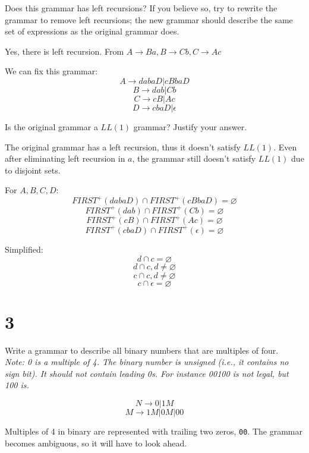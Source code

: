 \documentclass[11pt]{article}
\begin{document}
\begin{Parts}
	\Part Does this grammar has left recursions? If you believe so, try to rewrite the grammar to remove left recursions; the new grammar should describe the same set of expressions as the original grammar does.
	\begin{Answer}
		Yes, there is left recursion. From $A \rightarrow Ba, B \rightarrow Cb, C \rightarrow Ac$
		
		We can fix this grammar:
		$$A \rightarrow dabaD | cBbaD$$
		$$B \rightarrow dab | Cb$$
		$$C \rightarrow cB | Ac$$
		$$D \rightarrow cbaD | \epsilon$$
	\end{Answer}
	\Part Is the original grammar a $LL(1)$ grammar? Justify your answer.
	\begin{Answer}
		The original grammar has a left recursion, thus it doesn't satisfy $LL(1)$. Even after eliminating left recursion in $a$, the grammar still doesn't satisfy $LL(1)$ due to disjoint sets.
		
		For $A, B, C, D$:
		$$FIRST^+(dabaD) \cap FIRST^+(cBbaD) = \varnothing$$
		$$FIRST^+(dab) \cap FIRST^+(Cb) = \varnothing$$
		$$FIRST^+(cB) \cap FIRST^+(Ac) = \varnothing$$
		$$FIRST^+(cbaD) \cap FIRST^+(\epsilon) = \varnothing$$

		Simplified:
		$$d \cap c = \varnothing$$
		$$d \cap c, d \neq \varnothing$$
		$$c \cap c, d \neq \varnothing$$
		$$c \cap \epsilon = \varnothing$$
	\end{Answer}
\end{Parts}
	
\newpage

\section*{3}
Write a grammar to describe all binary numbers that are multiples of four. \\

\textit{Note: 0 is a multiple of 4.
The binary number is unsigned (i.e., it contains no sign bit).
It should not contain leading 0s. For instance 00100 is not legal, but 100 is.}

\begin{Answer}
	$$N \rightarrow 0 | 1 M$$
	$$M \rightarrow 1M | 0M | 00$$
	
	Multiples of 4 in binary are represented with trailing two zeros, \verb|00|. The grammar becomes ambiguous, so it will have to look ahead.
\end{Answer}
\newpage
\end{document}
